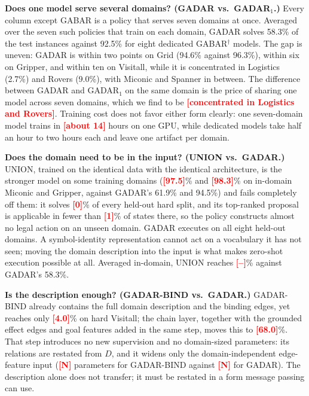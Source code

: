 \documentclass[letterpaper]{article} %
\newcommand{\gadar}{GADAR}                 %
\newcommand{\gadarbind}{\gadar{}-BIND}     %
\newcommand{\union}{UNION}                 %
\newcommand{\todonum}[1]{\textcolor{red}{\textbf{[#1]}}}
\begin{document}
\textbf{Does one model serve several domains? (\gadar{} vs.\ \gadar{}$_1$.)}
Every column except GABAR is a policy that serves seven domains at once.
Averaged over the seven such policies that train on each domain, \gadar{}
solves 58.3\% of the test instances against 92.5\% for eight dedicated
GABAR$^\dagger$ models. The gap is uneven: \gadar{} is within two points on
Grid (94.6\% against 96.3\%), within six on Gripper, and within ten on
Visitall, while it is concentrated in Logistics (2.7\%) and Rovers (9.0\%),
with Miconic and Spanner in between. The difference between \gadar{} and
\gadar{}$_1$ on the same domain is the price of sharing one model across
seven domains, which we find to be \todonum{concentrated in Logistics and
Rovers}. Training cost does not favor either form clearly: one seven-domain
model trains in \todonum{about 14} hours on one GPU, while dedicated models
take half an hour to two hours each and leave one artifact per domain.

\textbf{Does the domain need to be in the input? (\union{} vs.\ \gadar{}.)}
\union{}, trained on the identical data with the identical architecture,
is the stronger model on some training domains (\todonum{97.5}\% and
\todonum{98.3}\% on in-domain Miconic and Gripper, against \gadar{}'s 61.9\%
and 94.5\%) and fails
completely off them: it solves \todonum{0}\% of every held-out hard split,
and its top-ranked proposal is applicable in fewer than \todonum{1}\% of
states there, so the policy constructs almost no legal action on an unseen
domain. \gadar{} executes on all eight held-out domains. A symbol-identity
representation cannot act on a vocabulary it has not seen; moving the domain
description into the input is what makes zero-shot execution possible at
all. Averaged in-domain, \union{} reaches \todonum{--}\% against
\gadar{}'s 58.3\%.

\textbf{Is the description enough? (\gadarbind{} vs.\ \gadar{}.)}
\gadarbind{} already contains the full domain description and the binding
edges, yet reaches only \todonum{4.0}\% on hard Visitall; the chain layer,
together with the grounded effect edges and goal features added in the same
step, moves this to \todonum{68.0}\%. That step introduces no new supervision
and no domain-sized parameters: its relations are restated from $D$, and it
widens only the domain-independent edge-feature input
(\todonum{N} parameters for \gadarbind{} against \todonum{N} for
\gadar{}). The description alone does not transfer; it must be restated in
a form message passing can use.
\end{document}
